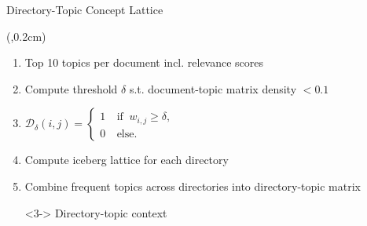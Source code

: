 \begin{frame}{Directory-Topic Concept Lattice}
    \begin{textblock*}{3.7cm}(\paperwidth-3.8cm,0.2cm) %
        \only<1>{
            
        }
    \end{textblock*}

    \begin{enumerate}
        \item Top 10 topics per document incl. relevance scores
        \item Compute threshold $\delta$ s.t. document-topic matrix density $< 0.1$
        \item $\mathcal{D}_\delta(i,j)=\left\{ \begin{array}{cl}
                        1 & \ \text{if } \ w_{i,j} \geq \delta, \\
                        0 & \ \text{else.}
                    \end{array} \right.$
        \item Compute iceberg lattice for each directory
        \item <2-> Combine frequent topics across directories into directory-topic matrix
        \item[\rightarrowfill] <3-> Directory-topic context
    \end{enumerate}



\end{frame}
